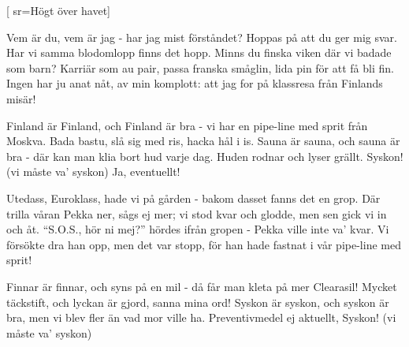 

[
sr={Högt över havet}]

\beginverse*
Vem är du, vem är jag -
har jag mist förståndet?
Hoppas på att du ger mig svar.
Har vi samma blodomlopp
finns det hopp.
Minns du finska viken där vi badade som barn?
Karriär som au pair, 
passa franska småglin,
lida pin för att få bli fin.
Ingen har ju anat nåt,
av min komplott:
att jag for på klassresa från Finlands misär!
\endverse

\beginchorus
Finland är Finland, och Finland är bra - 
vi har en pipe-line med sprit från Moskva.
Bada bastu, slå sig med ris,
hacka hål i is.
Sauna är sauna, och sauna är bra -
där kan man klia bort hud varje dag.
Huden rodnar och lyser grällt.
Syskon! (vi måste va' syskon)
Ja, eventuellt!
\endchorus

\beginverse*
Utedass, Euroklass,
hade vi på gården - 
bakom dasset fanns det en grop.
Där trilla våran Pekka ner,
sågs ej mer;
vi stod kvar och glodde, men sen gick vi in och åt.
``S.O.S., hör ni mej?'' hördes ifrån gropen -
Pekka ville inte va' kvar.
Vi försökte dra han opp,
men det var stopp,
för han hade fastnat i vår pipe-line med sprit!
\endverse

\beginchorus
Finnar är finnar, och syns på en mil -
då får man kleta på mer Clearasil!
Mycket täckstift, och lyckan är gjord,
sanna mina ord!
Syskon är syskon, och syskon är bra,
men vi blev fler än vad mor ville ha.
Preventivmedel ej aktuellt,
Syskon! (vi måste va' syskon)
\endchorus
\endsong


